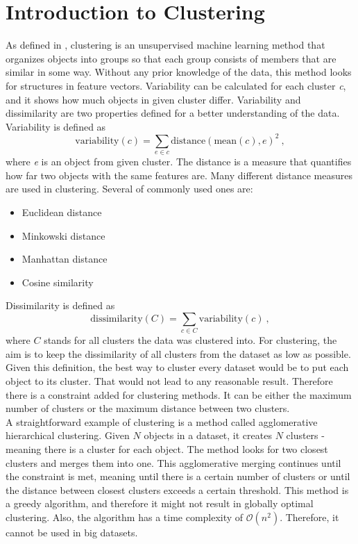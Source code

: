 \documentclass[thesis=B,english]{FITthesis}[2012/10/20]
\begin{document}
\section{Introduction to Clustering}\label{sec:clust_intro}
As defined in \cite{guttag2016introduction}, clustering is an unsupervised machine learning method that organizes objects into groups so that each group consists of members that are similar in some way.
Without any prior knowledge of the data, this method looks for structures in feature vectors.
Variability can be calculated for each cluster \textit{c}, and it shows how much objects in given cluster differ.
Variability and dissimilarity are two properties defined for a better understanding of the data. \\
Variability is defined as $$ \mathrm{variability}(c) = \sum_{e \in c} \mathrm{distance}(\mathrm{mean}(c), e)^2\:,$$ where \textit{e} is an object from given cluster.
The distance is a measure that quantifies how far two objects with the same features are. 
Many different distance measures are used in clustering.
Several of commonly used ones are:
\begin{itemize}
    \item Euclidean distance
    \item Minkowski distance
    \item Manhattan distance
    \item Cosine similarity
\end{itemize}

Dissimilarity is defined as $$ \mathrm{dissimilarity}(C) = \sum_{c \in C} \mathrm{variability}(c)\:,$$ where $C$ stands for all clusters the data was clustered into.
For clustering, the aim is to keep the dissimilarity of all clusters from the dataset as low as possible.
Given this definition, the best way to cluster every dataset would be to put each object to its cluster.
That would not lead to any reasonable result.
Therefore there is a constraint added for clustering methods.
It can be either the maximum number of clusters or the maximum distance between two clusters. \\

A straightforward example of clustering is a method called agglomerative hierarchical clustering.
Given $N$ objects in a dataset, it creates $N$ clusters - meaning there is a cluster for each object.
The method looks for two closest clusters and merges them into one.
This agglomerative merging continues until the constraint is met, meaning until there is a certain number of clusters or until the distance between closest clusters exceeds a certain threshold.
This method is a greedy algorithm, and therefore it might not result in globally optimal clustering.
Also, the algorithm has a time complexity of $\mathcal{O}(n^2)$.
Therefore, it cannot be used in big datasets. \\
\end{document}
